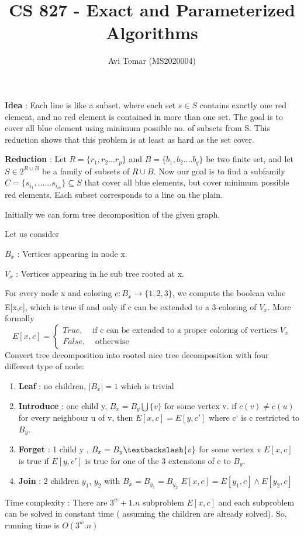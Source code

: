 \documentclass{homeworg}
\title{CS 827 - Exact and Parameterized Algorithms}
\author{Avi Tomar (MS2020004)}
\begin{document}
\maketitle

\exercise
\textbf{Idea} : Each line is like a subset. where each set $s \in S $ contains exactly one red element, and no red element is contained in more than one set. The goal is to cover all blue element using minimum possible no. of subsets from S. This reduction shows that this problem is at least as hard as the set cover.

\textbf{Reduction} : 
Let $R=\{r_1,r_2 ... r_p\}$ and $B=\{b_1, b_2 ....b_q\}$ be two finite set, and let $S \in 2^{R\cup B}$ be a family of subsets of $R \cup B$. Now our goal is to find a subfamily $C=\{s_{i_1}, ......s_{i_m} \} \subseteq S$ that cover all blue elements, but cover minimum possible red elements. Each subset corresponds to a line on the plain. 
\exercise

Initially we can form tree decomposition of the given graph.

Let us consider 

$B_x$ : Vertices appearing in node x.

$V_x$ : Vertices appearing in he sub tree rooted at x.

For every node x and coloring $c : B_x \xrightarrow[]{} \{1,2,3 \}$, we compute the boolean value E[x,c], which is true if and only if c can be extended to a 3-coloring of $V_x$. More formally 
\begin{equation}
    E[x,c]= \begin{cases}
    True, &\text{if c can be extended to a proper coloring of vertices $V_x$} \\
    False, &\text{ otherwise}
    \end{cases}
\end{equation}
Convert tree decomposition into rooted nice tree decomposition with four different type of node:

\begin{enumerate}
    \item \textbf{Leaf} : no children, $|B_x|=1$ which is trivial
    \item \textbf{Introduce} : one child y, $B_x = B_y \bigcup \{v\} $ for some vertex v. if $c(v) \neq c(u)$ for every neighbour u of v, then $E[x,c]=E[y,c']$ where c` is c restricted to $B_y$.
    \item \textbf{Forget} : 1 child y , $B_x = B_y \textbackslash \{v\}$ for some vertex v 
    $E[x,c]$ is true if $E[y,c']$ is true for one of the 3 extensions of c to $B_y$.
    \item \textbf{Join} : 2 children $y_1$, $y_2$ with $B_x=B_{y_1}=B_{y_2}$
    $E[x,c]=E[y_1,c]\land  E[y_2,c]$
    
    
\end{enumerate}
Time complexity : There are $3^w+1 . n $ subproblem $E[x,c]$ and each subproblem can be solved in constant time ( assuming the children are already solved).
    So, running time is $O(3^w.n)$
\end{document}
